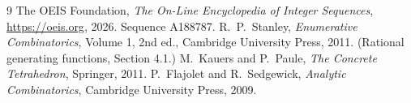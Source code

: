 \documentclass[11pt,a4paper]{article}
\theoremstyle{plain}
\theoremstyle{definition}
\begin{document}
\begin{thebibliography}{9}
 The OEIS Foundation, \emph{The On-Line Encyclopedia of Integer
Sequences}, \url{https://oeis.org}, 2026. Sequence A188787.
 R.~P.~Stanley, \emph{Enumerative Combinatorics}, Volume 1, 2nd ed.,
Cambridge University Press, 2011. (Rational generating functions, Section 4.1.)
 M.~Kauers and P.~Paule, \emph{The Concrete Tetrahedron}, Springer, 2011.
 P.~Flajolet and R.~Sedgewick, \emph{Analytic Combinatorics}, Cambridge
University Press, 2009.
\end{thebibliography}
\end{document}
